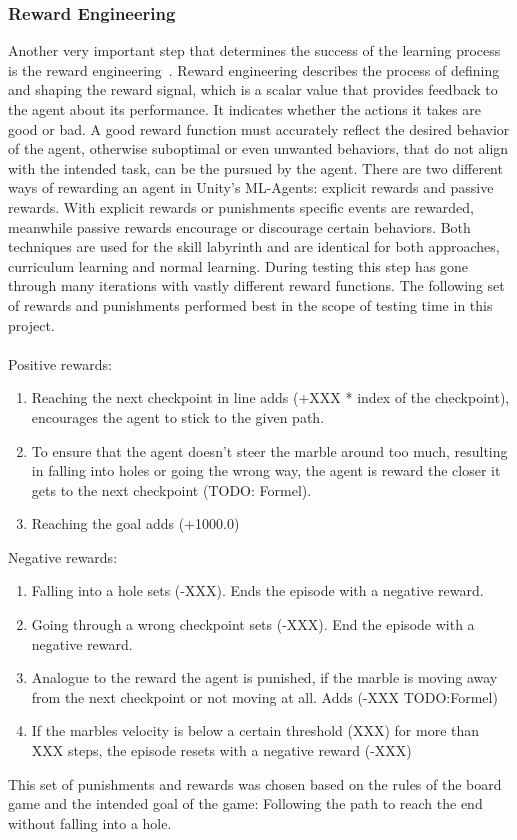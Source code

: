 \subsubsection{Reward Engineering}
Another very important step that determines the success of the learning process is the reward engineering~\cite{sutton_introduction_1992}.
Reward engineering describes the process of defining and shaping the reward signal, which is a scalar value that provides
feedback to the agent about its performance.
It indicates whether the actions it takes are good or bad.
A good reward function must accurately reflect the desired behavior of the agent, otherwise suboptimal or even
unwanted behaviors, that do not align with the intended task, can be the pursued by the agent.
There are two different ways of rewarding an agent in Unity's ML-Agents: explicit rewards and passive rewards.
With explicit rewards or punishments specific events are rewarded, meanwhile passive rewards encourage or discourage certain behaviors.
Both techniques are used for the skill labyrinth and are identical for both approaches, curriculum learning and normal learning.
During testing this step has gone through many iterations with vastly different reward functions.
The following set of rewards and punishments performed best in the scope of testing time in this project.\\\\
Positive rewards:
\begin{enumerate}
    \item Reaching the next checkpoint in line adds (+XXX * index of the checkpoint), encourages the agent to stick to the given path.
    \item To ensure that the agent doesn't steer the marble around too much, resulting in falling into holes or going the wrong way, the agent
    is reward the closer it gets to the next checkpoint (TODO: Formel).
    \item Reaching the goal adds (+1000.0)
\end{enumerate}
Negative rewards:
\begin{enumerate}
    \item Falling into a hole sets (-XXX). Ends the episode with a negative reward.
    \item Going through a wrong checkpoint sets (-XXX). End the episode with a negative reward.
    \item Analogue to the reward the agent is punished, if the marble is moving away from the next checkpoint or not moving at all.
    Adds (-XXX TODO:Formel)
    \item If the marbles velocity is below a certain threshold (XXX) for more than XXX steps, the episode resets with a negative reward (-XXX)
\end{enumerate}
This set of punishments and rewards was chosen based on the rules of the board game and the intended goal of the game:
Following the path to reach the end without falling into a hole.

